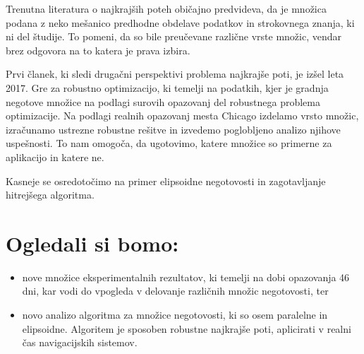 \documentclass[a4paper, 12 pt]{article}
\theoremstyle{plain}
\theoremstyle{definition}
\theoremstyle{remark}
\begin{document}
Trenutna literatura o najkrajših poteh običajno predvideva, da je množica podana z neko mešanico predhodne obdelave podatkov in strokovnega znanja, ki ni del študije. To pomeni, da so bile preučevane različne vrste množic, vendar brez odgovora na to katera je prava izbira.\newline

Prvi članek, ki sledi drugačni perspektivi problema najkrajše poti, je izšel leta 2017. Gre za robustno optimizacijo, ki temelji na podatkih, kjer je gradnja negotove množice na podlagi surovih opazovanj del robustnega problema optimizacije. Na podlagi realnih opazovanj mesta Chicago izdelamo vrsto množic, izračunamo ustrezne robustne rešitve in izvedemo poglobljeno analizo njihove uspešnosti. To nam omogoča, da ugotovimo, katere množice so primerne za aplikacijo in katere ne.\newline

Kasneje se osredotočimo na primer elipsoidne negotovosti in zagotavljanje hitrejšega algoritma. 

\section{Ogledali si bomo:}
\begin{itemize}
\item{nove množice eksperimentalnih rezultatov, ki temelji na dobi opazovanja 46 dni, kar vodi do vpogleda v delovanje različnih množic negotovosti, ter}
\item{novo analizo algoritma za množice negotovosti, ki so osem paralelne in elipsoidne. Algoritem je sposoben robustne najkrajše poti, aplicirati v realni čas navigacijskih sistemov.}
\end{itemize}
\end{document}

